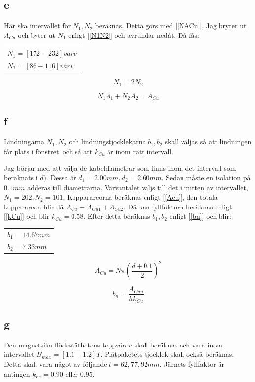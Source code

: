 \documentclass{article}
\begin{document}
\subsection{e}
Här ska intervallet för $N_1,N_2$ beräknas.
Detta görs med [\ref{NACu}], Jag bryter ut $A_{Cu}$ och byter ut $N_1$ enligt [\ref{N1N2}] och avrundar nedåt.
Då fås:

\begin{tabular}{|l}
  $N_1=[ 172 - 232]  varv$\\
  $N_2=[ 86 - 116]  varv$\\
\end{tabular}

\begin{equation}
  N_1=2N_2
  \label{N1N2}
\end{equation}

\begin{equation}
  N_1A_1+N_2A_2=A_{Cu}
  \label{NACu}
\end{equation}


\subsection{f}
Lindningarna $N_1,N_2$ och lindningstjocklekarna $b_1,b_2$ skall väljas så att lindningen får plats i fönstret\
och så att $k_{Cu}$ är inom rätt intervall.

Jag börjar med att välja de kabeldiametrar som finns inom det intervall som beräknats i $d)$.
Dessa är $d_1=2.00 mm,d_2=2.60 mm$.
Sedan måste en isolation på $0.1 mm$ adderas till diametrarna.
Varvantalet väljs till det i mitten av intervallet, $N_1=202, N_2=101$.
Kopparareorna beräknas enligt [\ref{Acu}], den totala koppararean blir då $A_{Cu}=A_{Cu1}+A_{Cu2}$.
Då kan fyllfaktorn beräknas enligt [\ref{kCu}] och blir $k_{Cu}= 0.58$.
Efter detta beräknas $b_1,b_2$ enligt [\ref{bn}] och blir:
\begin{tabular}{|l}
  $b_1=14.67 mm$\\
  $b_2=7.33 mm$\\
\end{tabular}


\begin{equation}
  A_{Cu}=N\pi(\frac{d+0.1}{2})^2
 \label{Acu}
 \end{equation}

\begin{equation}
  b_n=\frac{A_{Cun}}{h k_{Cu}}
  \label{bn}
\end{equation}

\subsection{g}
Den magnetsika flödestäthetens toppvärde skall beräknas och vara inom intervallet $B_{max}=[1.1 - 1.2] T$.
Plåtpaketets tjocklek skall också beräknas.
Detta skall vara något av följande $t = 62, 77, 92 mm$.
Järnets fyllfaktor är antingen $k_{Fe}=0.90$ eller $0.95$.
\end{document}
